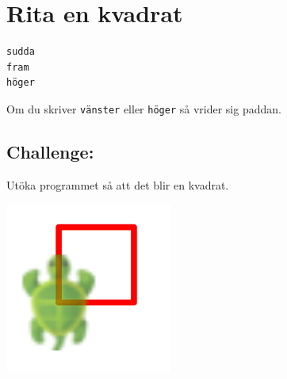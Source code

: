 \chapter{Rita en kvadrat}
\begin{multicols}{2}

\begin{lstlisting}[basicstyle={\ttfamily\fontsize{30}{36}\selectfont},numbers=none]
sudda
fram
höger
\end{lstlisting}
        
Om du skriver \lstinline{vänster} eller \lstinline{höger} så vrider sig paddan.
\section*{\color{BrickRed}Challenge:}
Utöka programmet så att det blir en kvadrat.

\columnbreak

\begin{center}
\includegraphics{../img/square.png}
\end{center}

\end{multicols}

